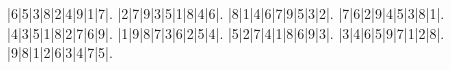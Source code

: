 \begin{sudoku}
|6|5|3|8|2|4|9|1|7|.
|2|7|9|3|5|1|8|4|6|.
|8|1|4|6|7|9|5|3|2|.
|7|6|2|9|4|5|3|8|1|.
|4|3|5|1|8|2|7|6|9|.
|1|9|8|7|3|6|2|5|4|.
|5|2|7|4|1|8|6|9|3|.
|3|4|6|5|9|7|1|2|8|.
|9|8|1|2|6|3|4|7|5|.
\end{sudoku}